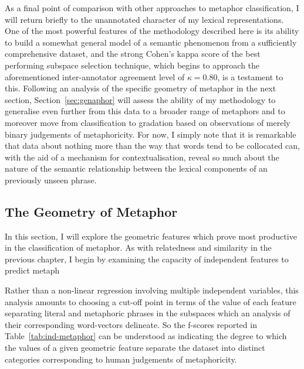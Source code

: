 As a final point of comparison with other approaches to metaphor classification, I will return briefly to the unannotated character of my lexical representations.  One of the most powerful features of the methodology described here is its ability to build a somewhat general model of a semantic phenomenon from a sufficiently comprehensive dataset, and the strong Cohen's kappa score of the best performing subspace selection technique, which begins to approach the aforementioned inter-annotator agreement level of $\kappa = 0.80$, is a testament to this.  Following an analysis of the specific geometry of metaphor in the next section, Section~\ref{sec:genaphor} will assess the ability of my methodology to generalise even further from this data to a broader range of metaphors and to moreover move from classification to gradation based on observations of merely binary judgements of metaphoricity.  For now, I simply note that it is remarkable that data about nothing more than the way that words tend to be collocated can, with the aid of a mechanism for contextualisation, reveal so much about the nature of the semantic relationship between the lexical components of an previously unseen phrase.

\subsection{The Geometry of Metaphor}
In this section, I will explore the geometric features which prove most productive in the classification of metaphor.  As with relatedness and similarity in the previous chapter, I begin by examining the capacity of independent features to predict metaph

Rather than a non-linear regression involving multiple independent variables, this analysis amounts to choosing a cut-off point in terms of the value of each feature separating literal and metaphoric phrases in the subspaces which an analysis of their corresponding word-vectors delineate.  So the f-scores reported in Table~\ref{tab:ind-metaphor} can be understood as indicating the degree to which the values of a given geometric feature separate the dataset into distinct categories corresponding to human judgements of metaphoricity.

